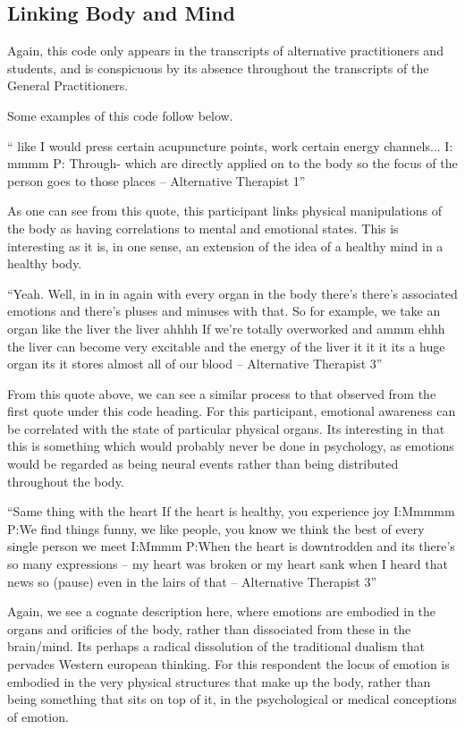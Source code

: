 \subsection{Linking Body and Mind}

Again, this code only appears in the transcripts of alternative practitioners and students, and is conspicuous by its absence throughout the transcripts of the General Practitioners. 

Some examples of this code follow below. 

`` like I would press certain acupuncture points, work certain energy channels...
I: mmmm
P: Through- which are directly applied on to the body so the focus of the person goes to those places – Alternative Therapist 1''

As one can see from this quote, this participant links physical manipulations of the body as having correlations to mental and emotional states. This is interesting as it is, in one sense, an extension of the idea of a healthy mind in a healthy body. 

``Yeah. Well, in in in again with every organ in the body there's there's associated emotions and there's pluses and minuses with that. So for example, we take an organ like the liver the liver ahhhh If we're totally overworked and ammm ehhh the liver can become very excitable and the energy of the liver it it it its a huge organ its it stores almost all of our blood – Alternative Therapist 3''

From this quote above, we can see a similar process to that observed from the first quote under this code heading. For this participant, emotional awareness can be correlated with the state of particular physical organs. Its interesting in that this is something which would probably never be done in psychology, as emotions would be regarded as being neural events rather than being distributed throughout the body. 

``Same thing with the heart If the heart is healthy, you experience joy 
I:Mmmmm
P:We find things funny, we like people, you know we think the best of every single person we meet 
I:Mmmm
P:When the heart is downtrodden and its there's so many expressions – my heart was broken or my heart sank when I heard that news so (pause) even in the lairs of that – Alternative Therapist 3''

Again, we see a cognate description here, where emotions are embodied in the organs and orificies of the body, rather than dissociated from these in the brain/mind. Its perhaps a radical dissolution of the traditional dualism that pervades Western european thinking. For this respondent the locus of emotion is embodied in the very physical structures that make up the body, rather than being something that sits on top of it, in the psychological or medical conceptions of emotion. 

